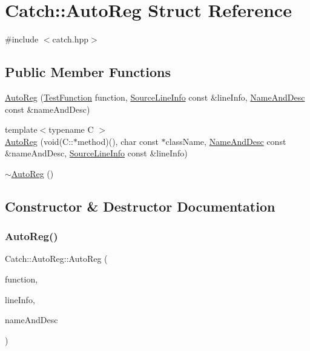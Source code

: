 \hypertarget{struct_catch_1_1_auto_reg}{}\section{Catch\+:\+:Auto\+Reg Struct Reference}
\label{struct_catch_1_1_auto_reg}


{\ttfamily \#include $<$catch.\+hpp$>$}

\subsection*{Public Member Functions}
\begin{DoxyCompactItemize}
\item 
\mbox{\hyperlink{struct_catch_1_1_auto_reg_af224f4568d57b8652474df475a164a8c}{Auto\+Reg}} (\mbox{\hyperlink{namespace_catch_a26414f52d0835939fae52aadd27e6257}{Test\+Function}} function, \mbox{\hyperlink{struct_catch_1_1_source_line_info}{Source\+Line\+Info}} const \&line\+Info, \mbox{\hyperlink{struct_catch_1_1_name_and_desc}{Name\+And\+Desc}} const \&name\+And\+Desc)
\item 
{\footnotesize template$<$typename C $>$ }\\\mbox{\hyperlink{struct_catch_1_1_auto_reg_a1bf9207fe0a02b46dc0ab1cc03cbe738}{Auto\+Reg}} (void(C\+::$\ast$method)(), char const $\ast$class\+Name, \mbox{\hyperlink{struct_catch_1_1_name_and_desc}{Name\+And\+Desc}} const \&name\+And\+Desc, \mbox{\hyperlink{struct_catch_1_1_source_line_info}{Source\+Line\+Info}} const \&line\+Info)
\item 
\mbox{\hyperlink{struct_catch_1_1_auto_reg_a3cdb53f1e5ff115310f3372bebe198f1}{$\sim$\+Auto\+Reg}} ()
\end{DoxyCompactItemize}


\subsection{Constructor \& Destructor Documentation}
\mbox{\label{struct_catch_1_1_auto_reg_af224f4568d57b8652474df475a164a8c}} 
\subsubsection{\texorpdfstring{Auto\+Reg()}{AutoReg()}\hspace{0.1cm}{\footnotesize\ttfamily [1/2]}}
{\footnotesize\ttfamily Catch\+::\+Auto\+Reg\+::\+Auto\+Reg (\begin{DoxyParamCaption}\item[{\mbox{\hyperlink{namespace_catch_a26414f52d0835939fae52aadd27e6257}{Test\+Function}}}]{function,  }\item[{\mbox{\hyperlink{struct_catch_1_1_source_line_info}{Source\+Line\+Info}} const \&}]{line\+Info,  }\item[{\mbox{\hyperlink{struct_catch_1_1_name_and_desc}{Name\+And\+Desc}} const \&}]{name\+And\+Desc }\end{DoxyParamCaption})}

